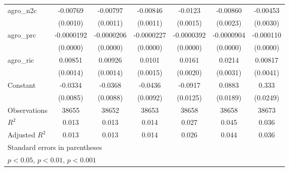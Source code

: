 {\begin{tabular}{l*{6}{c}}
\addlinespace
agro\_n2c            &    -0.00769\sym{***}&    -0.00797\sym{***}&    -0.00846\sym{***}&     -0.0123\sym{***}&    -0.00860\sym{***}&    -0.00453         \\
                    &    (0.0010)         &    (0.0011)         &    (0.0011)         &    (0.0015)         &    (0.0023)         &    (0.0030)         \\
\addlinespace
agro\_prc            &  -0.0000192\sym{***}&  -0.0000206\sym{***}&  -0.0000227\sym{***}&  -0.0000392\sym{***}&  -0.0000904\sym{***}&   -0.000110\sym{***}\\
                    &    (0.0000)         &    (0.0000)         &    (0.0000)         &    (0.0000)         &    (0.0000)         &    (0.0000)         \\
\addlinespace
agro\_ric            &     0.00851\sym{***}&     0.00926\sym{***}&      0.0101\sym{***}&      0.0161\sym{***}&      0.0214\sym{***}&     0.00817\sym{*}  \\
                    &    (0.0014)         &    (0.0014)         &    (0.0015)         &    (0.0020)         &    (0.0031)         &    (0.0041)         \\
\addlinespace
Constant            &     -0.0334\sym{***}&     -0.0368\sym{***}&     -0.0436\sym{***}&     -0.0917\sym{***}&      0.0883\sym{***}&       0.333\sym{***}\\
                    &    (0.0085)         &    (0.0088)         &    (0.0092)         &    (0.0125)         &    (0.0189)         &    (0.0249)         \\
\midrule
Observations        &       38655         &       38652         &       38653         &       38658         &       38658         &       38673         \\
\(R^{2}\)           &       0.013         &       0.013         &       0.014         &       0.027         &       0.045         &       0.036         \\
Adjusted \(R^{2}\)  &       0.013         &       0.013         &       0.014         &       0.026         &       0.044         &       0.036         \\
\bottomrule
\multicolumn{7}{l}{\footnotesize Standard errors in parentheses}\\
\multicolumn{7}{l}{\footnotesize \sym{*} \(p<0.05\), \sym{**} \(p<0.01\), \sym{***} \(p<0.001\)}\\
\end{tabular}
}
